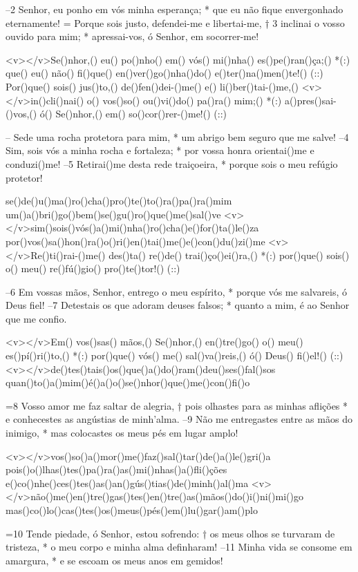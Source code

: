 –2 Senhor, eu ponho em vós minha esperança; *
que eu não fique envergonhado eternamente!
= Porque sois justo, defendei-me e libertai-me, †
3 inclinai o vosso ouvido para mim; *
apressai-vos, ó Senhor, em socorrer-me!

<v></v>Se()nhor,() eu() po()nho() em() vós() mi()nha() es()pe()ran()ça;() *(:)
que() eu() não() fi()que() en()ver()go()nha()do() e()ter()na()men()te!() (::)
Por()que() sois() jus()to,() de()fen()dei-()me() e() li()ber()tai-()me,()
<v></v>in()cli()nai() o() vos()so() ou()vi()do() pa()ra() mim;() *(:)
a()pres()sai-()vos,() ó() Se()nhor,() em() so()cor()rer-()me!() (::)

– Sede uma rocha protetora para mim, *
um abrigo bem seguro que me salve!
–4 Sim, sois vós a minha rocha e fortaleza; *
por vossa honra orientai()me e conduzi()me!
–5 Retirai()me desta rede traiçoeira, *
porque sois o meu refúgio protetor!

se()de()u()ma()ro()cha()pro()te()to()ra()pa()ra()mim
um()a()bri()go()bem()se()gu()ro()que()me()sal()ve
<v></v>sim()sois()vós()a()mi()nha()ro()cha()e()for()ta()le()za
por()vos()sa()hon()ra()o()ri()en()tai()me()e()con()du()zi()me
<v></v>Re()ti()rai-()me() des()ta() re()de() trai()ço()ei()ra,() *(:)
por()que() sois() o() meu() re()fú()gio() pro()te()tor!() (::)

–6 Em vossas mãos, Senhor, entrego o meu espírito, *
porque vós me salvareis, ó Deus fiel!
–7 Detestais os que adoram deuses falsos; *
quanto a mim, é ao Senhor que me confio.

<v></v>Em() vos()sas() mãos,() Se()nhor,() en()tre()go() o() meu() es()pí()ri()to,() *(:)
por()que() vós() me() sal()va()reis,() ó() Deus() fi()el!() (::)
<v></v>de()tes()tais()os()que()a()do()ram()deu()ses()fal()sos
quan()to()a()mim()é()a()o()se()nhor()que()me()con()fi()o

=8 Vosso amor me faz saltar de alegria, †
pois olhastes para as minhas aflições *
e conhecestes as angústias de minh’alma.
–9 Não me entregastes entre as mãos do inimigo, *
mas colocastes os meus pés em lugar amplo!

<v></v>vos()so()a()mor()me()faz()sal()tar()de()a()le()gri()a
pois()o()lhas()tes()pa()ra()as()mi()nhas()a()fli()ções
e()co()nhe()ces()tes()as()an()gús()tias()de()minh()al()ma
<v></v>não()me()en()tre()gas()tes()en()tre()as()mãos()do()i()ni()mi()go
mas()co()lo()cas()tes()os()meus()pés()em()lu()gar()am()plo

=10 Tende piedade, ó Senhor, estou sofrendo: †
os meus olhos se turvaram de tristeza, *
o meu corpo e minha alma definharam!
–11 Minha vida se consome em amargura, *
e se escoam os meus anos em gemidos!

